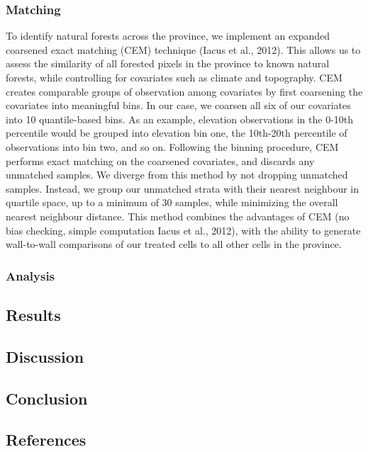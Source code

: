 \documentclass[
]{agujournal2019}
\begin{document}
\subsubsection{Matching}\label{sec-matching}

To identify natural forests across the province, we implement an
expanded coarsened exact matching (CEM) technique (Iacus et al., 2012).
This allows us to assess the similarity of all forested pixels in the
province to known natural forests, while controlling for covariates such
as climate and topography. CEM creates comparable groups of observation
among covariates by first coarsening the covariates into meaningful
bins. In our case, we coarsen all six of our covariates into 10
quantile-based bins. As an example, elevation observations in the 0-10th
percentile would be grouped into elevation bin one, the 10th-20th
percentile of observations into bin two, and so on. Following the
binning procedure, CEM performs exact matching on the coarsened
covariates, and discards any unmatched samples. We diverge from this
method by not dropping unmatched samples. Instead, we group our
unmatched strata with their nearest neighbour in quartile space, up to a
minimum of 30 samples, while minimizing the overall nearest neighbour
distance. This method combines the advantages of CEM (no bias checking,
simple computation Iacus et al., 2012), with the ability to generate
wall-to-wall comparisons of our treated cells to all other cells in the
province.

\subsubsection{Analysis}\label{analysis}

\subsection{Results}\label{results}

\subsection{Discussion}\label{discussion}

\subsection{Conclusion}\label{conclusion}

\subsection*{References}\label{references}
\end{document}
